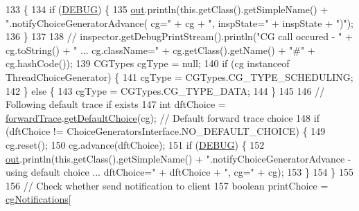\begin{DoxyCode}
133                                                                                              \{
134     \textcolor{keywordflow}{if} (\hyperlink{classgov_1_1nasa_1_1jpf_1_1inspector_1_1server_1_1choicegenerators_1_1_choice_generators_manager_aa915518f3438e94d8f18d8d0747dc9d9}{DEBUG}) \{
135       \hyperlink{classgov_1_1nasa_1_1jpf_1_1inspector_1_1server_1_1choicegenerators_1_1_choice_generators_manager_a6fb73457e2b6a476ce657a0c51f936a6}{out}.println(this.getClass().getSimpleName() + \textcolor{stringliteral}{".notifyChoiceGeneratorAdvance( cg="} + cg + \textcolor{stringliteral}{",
       inspState="} + inspState + \textcolor{stringliteral}{")"});
136     \}
137 
138     \textcolor{comment}{// inspector.getDebugPrintStream().println("CG call occured - " + cg.toString() + " ... cg.className="
       + cg.getClass().getName() + "#" + cg.hashCode());}
139     CGTypes cgType = null;
140     \textcolor{keywordflow}{if} (cg instanceof ThreadChoiceGenerator) \{
141       cgType = CGTypes.CG\_TYPE\_SCHEDULING;
142     \} \textcolor{keywordflow}{else} \{
143       cgType = CGTypes.CG\_TYPE\_DATA;
144     \}
145 
146     \textcolor{comment}{// Following default trace if exists}
147     \textcolor{keywordtype}{int} dftChoice = \hyperlink{classgov_1_1nasa_1_1jpf_1_1inspector_1_1server_1_1choicegenerators_1_1_choice_generators_manager_af50c2456f9d16dcf53d9bd26bc279b29}{forwardTrace}.\hyperlink{classgov_1_1nasa_1_1jpf_1_1inspector_1_1server_1_1breakpoints_1_1_default_forward_trace_manager_a5e478c76207004e5d971178560c255df}{getDefaultChoice}(cg); \textcolor{comment}{// Default forward trace
       choice}
148     \textcolor{keywordflow}{if} (dftChoice != ChoiceGeneratorsInterface.NO\_DEFAULT\_CHOICE) \{
149       cg.reset();
150       cg.advance(dftChoice);
151       \textcolor{keywordflow}{if} (\hyperlink{classgov_1_1nasa_1_1jpf_1_1inspector_1_1server_1_1choicegenerators_1_1_choice_generators_manager_aa915518f3438e94d8f18d8d0747dc9d9}{DEBUG}) \{
152         \hyperlink{classgov_1_1nasa_1_1jpf_1_1inspector_1_1server_1_1choicegenerators_1_1_choice_generators_manager_a6fb73457e2b6a476ce657a0c51f936a6}{out}.println(this.getClass().getSimpleName() + \textcolor{stringliteral}{".notifyChoiceGeneratorAdvance - using default
       choice ... dftChoice="} + dftChoice + \textcolor{stringliteral}{", cg="} + cg);
153       \}
154     \}
155 
156     \textcolor{comment}{// Check whether send notification to client}
157     \textcolor{keywordtype}{boolean} printChoice = \hyperlink{classgov_1_1nasa_1_1jpf_1_1inspector_1_1server_1_1choicegenerators_1_1_choice_generators_manager_ab6f3e1ad030f6d5af4314d1c27829fa0}{cgNotifications}[

\end{DoxyCode}
